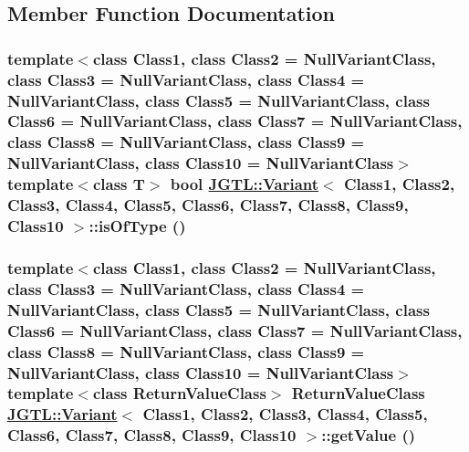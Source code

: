 \subsection{Member Function Documentation}
\hypertarget{class_j_g_t_l_1_1_variant_6fe19e740be4b46f6e9ff7cfc5c380db}{
\subsubsection[isOfType]{\setlength{\rightskip}{0pt plus 5cm}template$<$class Class1, class Class2 = Null\-Variant\-Class, class Class3 = Null\-Variant\-Class, class Class4 = Null\-Variant\-Class, class Class5 = Null\-Variant\-Class, class Class6 = Null\-Variant\-Class, class Class7 = Null\-Variant\-Class, class Class8 = Null\-Variant\-Class, class Class9 = Null\-Variant\-Class, class Class10 = Null\-Variant\-Class$>$ template$<$class T$>$ bool \hyperlink{class_j_g_t_l_1_1_variant}{JGTL::Variant}$<$ Class1, Class2, Class3, Class4, Class5, Class6, Class7, Class8, Class9, Class10 $>$::is\-Of\-Type ()}}
\label{class_j_g_t_l_1_1_variant_6fe19e740be4b46f6e9ff7cfc5c380db}


\hypertarget{class_j_g_t_l_1_1_variant_abc5e046158a10009195be7b4e93a6b3}{
\subsubsection[getValue]{\setlength{\rightskip}{0pt plus 5cm}template$<$class Class1, class Class2 = Null\-Variant\-Class, class Class3 = Null\-Variant\-Class, class Class4 = Null\-Variant\-Class, class Class5 = Null\-Variant\-Class, class Class6 = Null\-Variant\-Class, class Class7 = Null\-Variant\-Class, class Class8 = Null\-Variant\-Class, class Class9 = Null\-Variant\-Class, class Class10 = Null\-Variant\-Class$>$ template$<$class Return\-Value\-Class$>$ Return\-Value\-Class \hyperlink{class_j_g_t_l_1_1_variant}{JGTL::Variant}$<$ Class1, Class2, Class3, Class4, Class5, Class6, Class7, Class8, Class9, Class10 $>$::get\-Value ()}}
\label{class_j_g_t_l_1_1_variant_abc5e046158a10009195be7b4e93a6b3}


